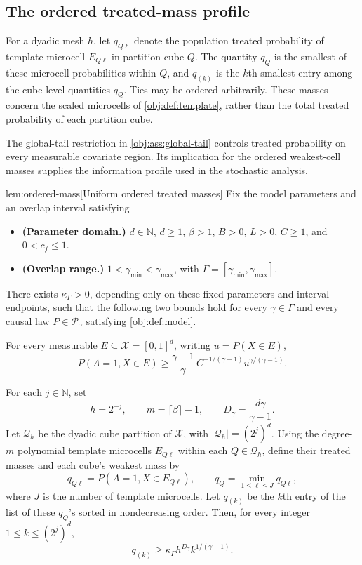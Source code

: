 \subsection{The ordered treated-mass profile}

For a dyadic mesh \(h\), let \(q_{Q\ell}\) denote the population treated probability of template microcell \(E_{Q\ell}\) in partition cube \(Q\). The quantity \(q_Q\) is the smallest of these microcell probabilities within \(Q\), and \(q_{(k)}\) is the \(k\)th smallest entry among the cube-level quantities \(q_Q\). Ties may be ordered arbitrarily. These masses concern the scaled microcells of \cref{obj:def:template}, rather than the total treated probability of each partition cube.

The global-tail restriction in \cref{obj:ass:global-tail} controls treated probability on every measurable covariate region. Its implication for the ordered weakest-cell masses supplies the information profile used in the stochastic analysis.

\begin{lemmav}{lem:ordered-mass}[Uniform ordered treated masses]
Fix the model parameters and an overlap interval satisfying
\begin{itemize}
\item \textbf{(Parameter domain.)} \(d\in\mathbb N\), \(d\ge1\), \(\beta>1\), \(B>0\), \(L>0\), \(C\ge1\), and \(0<c_f\le1\).
\item \textbf{(Overlap range.)} \(1<\gamma_{\min}<\gamma_{\max}\), with \(\Gamma=[\gamma_{\min},\gamma_{\max}]\).
\end{itemize}
There exists \(\kappa_\Gamma>0\), depending only on these fixed parameters and interval endpoints, such that the following two bounds hold for every \(\gamma\in\Gamma\) and every causal law \(P\in\mathcal P_\gamma\) satisfying \cref{obj:def:model}.

For every measurable \(E\subseteq\mathcal X=[0,1]^d\), writing \(u=P(X\in E)\),
\[
P(A=1,X\in E)
\ge
\frac{\gamma-1}{\gamma}\,
C^{-1/(\gamma-1)}u^{\gamma/(\gamma-1)}.
\]

For each \(j\in\mathbb N\), set
\[
h=2^{-j},\qquad
m=\lceil\beta\rceil-1,\qquad
D_\gamma=\frac{d\gamma}{\gamma-1}.
\]
Let \(\mathcal Q_h\) be the dyadic cube partition of \(\mathcal X\), with \(|\mathcal Q_h|=(2^j)^d\). Using the degree-\(m\) polynomial template microcells \(E_{Q\ell}\) within each \(Q\in\mathcal Q_h\), define their treated masses and each cube's weakest mass by
\[
q_{Q\ell}=P(A=1,X\in E_{Q\ell}),
\qquad
q_Q=\min_{1\le\ell\le J}q_{Q\ell},
\]
where \(J\) is the number of template microcells. Let \(q_{(k)}\) be the \(k\)th entry of the list of these \(q_Q\)'s sorted in nondecreasing order. Then, for every integer \(1\le k\le(2^j)^d\),
\[
q_{(k)}
\ge
\kappa_\Gamma h^{D_\gamma}k^{1/(\gamma-1)}.
\]
\end{lemmav}

